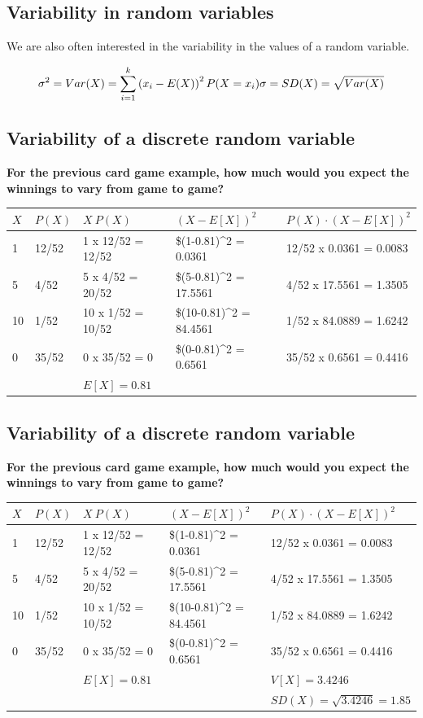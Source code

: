 \documentclass[
]{article}
\begin{document}
\hypertarget{variability-in-random-variables}{%
\subsection{Variability in random
variables}\label{variability-in-random-variables}}

We are also often interested in the variability in the values of a
random variable.

\[
\sigma^2 = Var(X) = \sum_{i = 1}^k \left(x_i - E(X)\right)^2 P(X = x_i)\\
\;\\
\sigma = SD(X) = \sqrt{Var(X)}
\]

\hypertarget{variability-of-a-discrete-random-variable}{%
\subsection{Variability of a discrete random
variable}\label{variability-of-a-discrete-random-variable}}

\textbf{For the previous card game example, how much would you expect
the winnings to vary from game to game?}

\begin{longtable}[]{@{}lllll@{}}
\toprule
\(X\) & \(P(X)\) & \(X~P(X)\) & \((X-E[X])^2\) &
\(P(X)\cdot (X-E[X])^2\)\tabularnewline
\midrule
\endhead
1 & 12/52 & 1 x 12/52 = 12/52 & \$(1-0.81)\^{}2 = 0.0361 & 12/52 x
0.0361 = 0.0083\tabularnewline
5 & 4/52 & 5 x 4/52 = 20/52 & \$(5-0.81)\^{}2 = 17.5561 & 4/52 x 17.5561
= 1.3505\tabularnewline
10 & 1/52 & 10 x 1/52 = 10/52 & \$(10-0.81)\^{}2 = 84.4561 & 1/52 x
84.0889 = 1.6242\tabularnewline
0 & 35/52 & 0 x 35/52 = 0 & \$(0-0.81)\^{}2 = 0.6561 & 35/52 x 0.6561 =
0.4416\tabularnewline
& & \(E[X] = 0.81\) & &\tabularnewline
\bottomrule
\end{longtable}

\hypertarget{variability-of-a-discrete-random-variable-1}{%
\subsection{Variability of a discrete random
variable}\label{variability-of-a-discrete-random-variable-1}}

\textbf{For the previous card game example, how much would you expect
the winnings to vary from game to game?}

\begin{longtable}[]{@{}lllll@{}}
\toprule
\(X\) & \(P(X)\) & \(X~P(X)\) & \((X-E[X])^2\) &
\(P(X)\cdot (X-E[X])^2\)\tabularnewline
\midrule
\endhead
1 & 12/52 & 1 x 12/52 = 12/52 & \$(1-0.81)\^{}2 = 0.0361 & 12/52 x
0.0361 = 0.0083\tabularnewline
5 & 4/52 & 5 x 4/52 = 20/52 & \$(5-0.81)\^{}2 = 17.5561 & 4/52 x 17.5561
= 1.3505\tabularnewline
10 & 1/52 & 10 x 1/52 = 10/52 & \$(10-0.81)\^{}2 = 84.4561 & 1/52 x
84.0889 = 1.6242\tabularnewline
0 & 35/52 & 0 x 35/52 = 0 & \$(0-0.81)\^{}2 = 0.6561 & 35/52 x 0.6561 =
0.4416\tabularnewline
& & \(E[X] = 0.81\) & & \(V[X] = 3.4246\)\tabularnewline
& & & & \(SD(X) = \sqrt{3.4246} = 1.85\)\tabularnewline
\bottomrule
\end{longtable}
\end{document}
